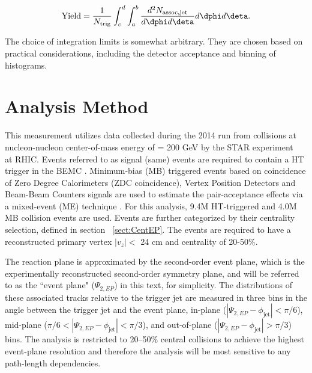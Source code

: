 \begin{equation}
	\mathrm{Yield} = \frac{1}{N_{\rm trig}} \int_{c}^{d} \int_{a}^{b} 
	\frac{d^2N_{\rm assoc,jet}}{d\dphi d\deta}  d\dphi d\deta.
	\label{Eqtn:Yield}
\end{equation}

\noindent  The choice of integration limits is somewhat arbitrary.  They are chosen based on practical considerations, including the detector acceptance and binning of histograms.  

\section{Analysis Method} \label{sect:Method}
This measurement utilizes data collected during the 2014 run from \AuAu collisions at nucleon-nucleon center-of-mass energy of \sNN = 200 GeV by the STAR experiment~\cite{Ackermann:2002ad} at RHIC.  Events referred to as signal (same) events are required to contain a HT trigger in the BEMC \cite{Beddo:2002zx}.  Minimum-bias (MB) triggered events based on coincidence of Zero Degree Calorimeters (ZDC coincidence), Vertex Position Detectors and Beam-Beam Counters signals are used to estimate the pair-acceptance effects via a mixed-event (ME) technique \cite{PhysRevC.96.024905}. For this analysis, 9.4M HT-triggered and 4.0M MB collision events are used.  Events are further categorized by their centrality selection, defined in section ~\ref{sect:CentEP}.  The events are required to have a reconstructed primary vertex $|v_{z}| <$ 24 cm and centrality of 20-50\%.  



The reaction plane is approximated by the second-order event plane, which is the experimentally reconstructed second-order symmetry plane, and will be referred to as the ``event plane" ($\Psi_{2,EP}$) in this text, for simplicity. %
The distributions of these associated tracks relative to the trigger jet are measured in three bins in the angle between the trigger jet and the event plane, in-plane ($| \Psi_{2,EP}-\phi_{\mathrm {jet}}|<\pi/6$), mid-plane ($\pi/6<|\Psi_{2,EP}-\phi_{\mathrm {jet}}|<\pi/3$), and out-of-plane ($|\Psi_{2,EP}-\phi_{\mathrm {jet}}|>\pi/3$) bins.  The analysis is restricted to 20--50\% central \AuAu collisions to achieve the highest event-plane resolution and therefore the analysis will be most sensitive to any path-length dependencies. %

